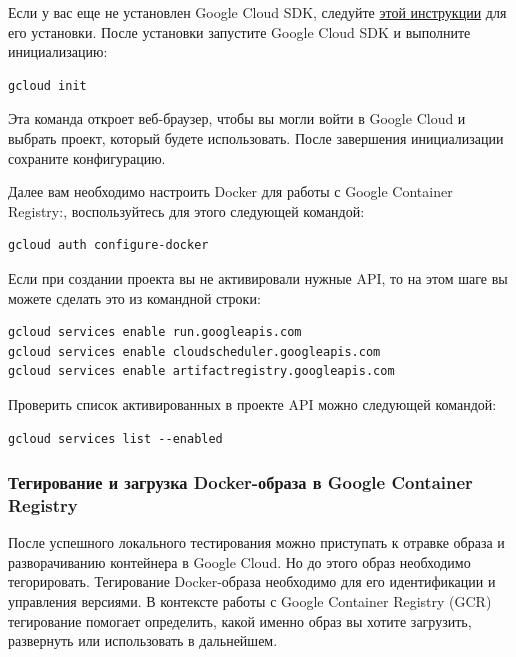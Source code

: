 \documentclass[
]{book}
\begin{document}
Если у вас еще не установлен Google Cloud SDK, следуйте \href{https://cloud.google.com/sdk/docs/install-sdk}{этой инструкции} для его установки. После установки запустите Google Cloud SDK и выполните инициализацию:

\begin{verbatim}
gcloud init
\end{verbatim}

Эта команда откроет веб-браузер, чтобы вы могли войти в Google Cloud и выбрать проект, который будете использовать. После завершения инициализации сохраните конфигурацию.

Далее вам необходимо настроить Docker для работы с Google Container Registry:, воспользуйтесь для этого следующей командой:

\begin{verbatim}
gcloud auth configure-docker
\end{verbatim}

Если при создании проекта вы не активировали нужные API, то на этом шаге вы можете сделать это из командной строки:

\begin{verbatim}
gcloud services enable run.googleapis.com
gcloud services enable cloudscheduler.googleapis.com
gcloud services enable artifactregistry.googleapis.com
\end{verbatim}

Проверить список активированных в проекте API можно следующей командой:

\begin{verbatim}
gcloud services list --enabled
\end{verbatim}

\subsubsection{Тегирование и загрузка Docker-образа в Google Container Registry}\label{ux442ux435ux433ux438ux440ux43eux432ux430ux43dux438ux435-ux438-ux437ux430ux433ux440ux443ux437ux43aux430-docker-ux43eux431ux440ux430ux437ux430-ux432-google-container-registry}

После успешного локального тестирования можно приступать к отравке образа и разворачиванию контейнера в Google Cloud. Но до этого образ необходимо тегорировать. Тегирование Docker-образа необходимо для его идентификации и управления версиями. В контексте работы с Google Container Registry (GCR) тегирование помогает определить, какой именно образ вы хотите загрузить, развернуть или использовать в дальнейшем.
\end{document}
